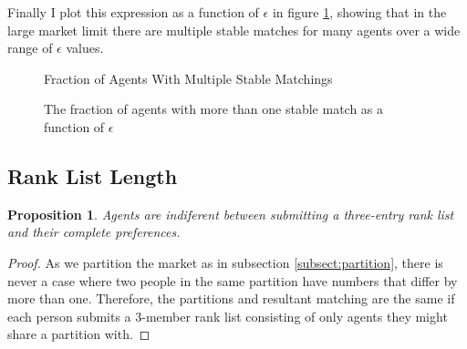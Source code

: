 \documentclass[WP]{AEA}
\newtheorem{prop}{Proposition}
\begin{document}
Finally I plot this expression as a function of $\epsilon$ in figure \ref{fig:multi_match}, showing that in the large market limit there are multiple stable matches for many agents over a wide range of $\epsilon$ values.

\begin{figure}[p]{Fraction of Agents With Multiple Stable Matchings}
	\caption{The fraction of agents with more than one stable match as a function of $\epsilon$}
	\label{fig:multi_match}
\end{figure}

\subsection{Rank List Length}

\begin{prop}
	Agents are indiferent between submitting a three-entry rank list and their complete preferences.
\end{prop}

\begin{proof}
	As we partition the market as in subsection \ref{subsect:partition}, there is never a case where two people in the same partition have numbers that differ by more than one. Therefore, the partitions and resultant matching are the same if each person submits a 3-member rank list consisting of only agents they might share a partition with.
\end{proof}
\end{document}
